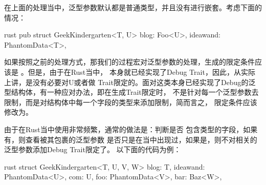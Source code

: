 在上面的处理当中，泛型参数默认都是普通类型，并且没有进行嵌套。考虑下面的情况：
\begin{code-block}{rust}
pub struct GeekKindergarten<T, U> {
    blog: Foo<U>,
    ideawand: PhantomData<T>,
}
\end{code-block}
如果按照之前的处理方式，那我们的过程宏对泛型参数的处理，生成的限定条件应该是
。但是，由于在Rust当中，
本身就已经实现了Debug Trait，因此，从实际上讲，是没有必要对U或者做
Trait限定的。面对这类本身已经实现了Debug的泛型结构体，有一种应对办法，即在生成Trait限定时，
不是针对每一个泛型参数去限制，而是对结构体中每一个字段的类型来添加限制，简而言之，
限定条件应该修改为。

由于在Rust当中使用非常频繁，通常的做法是：判断是否
包含类型的字段，如果有，则查看被其包裹的泛型参数
是否只是在当中出现过，如果是，则不对相关的泛型参数添加Debug Trait限定了。
以下面的代码为例：
\begin{code-block}{rust}
struct GeekKindergarten<T, U, V, W> {
    blog: T,
    ideawand: PhantomData<U>,
    com: U,
    foo: PhantomData<V>,
    bar: Baz<W>,
}
\end{code-block}


